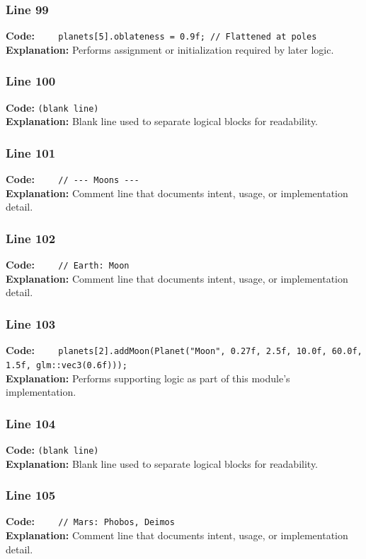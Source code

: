 \documentclass[11pt,a4paper]{article}
\begin{document}
\subsubsection*{Line 99}
\textbf{Code:} \verb|    planets[5].oblateness = 0.9f; // Flattened at poles|\\
\textbf{Explanation:} Performs assignment or initialization required by later logic.

\subsubsection*{Line 100}
\textbf{Code:} \texttt{(blank line)}\\
\textbf{Explanation:} Blank line used to separate logical blocks for readability.

\subsubsection*{Line 101}
\textbf{Code:} \verb|    // --- Moons ---|\\
\textbf{Explanation:} Comment line that documents intent, usage, or implementation detail.

\subsubsection*{Line 102}
\textbf{Code:} \verb|    // Earth: Moon|\\
\textbf{Explanation:} Comment line that documents intent, usage, or implementation detail.

\subsubsection*{Line 103}
\textbf{Code:} \verb|    planets[2].addMoon(Planet("Moon", 0.27f, 2.5f, 10.0f, 60.0f, 1.5f, glm::vec3(0.6f)));|\\
\textbf{Explanation:} Performs supporting logic as part of this module's implementation.

\subsubsection*{Line 104}
\textbf{Code:} \texttt{(blank line)}\\
\textbf{Explanation:} Blank line used to separate logical blocks for readability.

\subsubsection*{Line 105}
\textbf{Code:} \verb|    // Mars: Phobos, Deimos|\\
\textbf{Explanation:} Comment line that documents intent, usage, or implementation detail.
\end{document}

